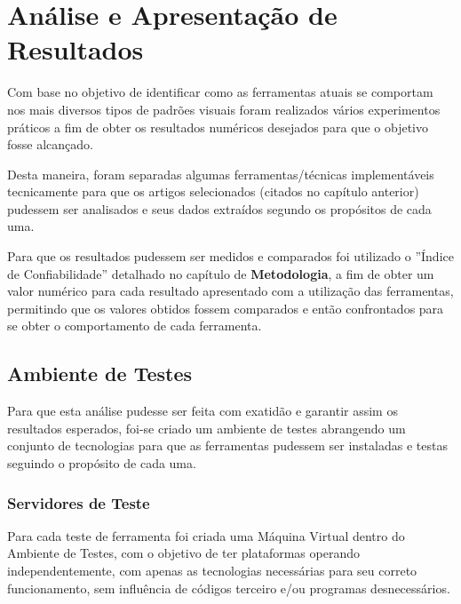 
\chapter{Análise e Apresentação de Resultados}


Com base no objetivo de identificar como as ferramentas atuais se comportam nos mais diversos tipos de padrões visuais foram realizados vários experimentos práticos a fim de obter os resultados numéricos desejados para que o objetivo fosse alcançado.

Desta maneira, foram separadas algumas ferramentas/técnicas implementáveis tecnicamente para que os artigos selecionados (citados no capítulo anterior) pudessem ser analisados e seus dados extraídos segundo os propósitos de cada uma.


Para que os resultados pudessem ser medidos e comparados foi utilizado o ''Índice de Confiabilidade'' detalhado no capítulo de \textbf{Metodologia}, a fim de obter um valor numérico para cada resultado apresentado com a utilização das ferramentas, permitindo que os valores obtidos fossem comparados e então confrontados para se obter o comportamento de cada ferramenta.



\section{Ambiente de Testes}

Para que esta análise pudesse ser feita com exatidão e garantir assim os resultados esperados, foi-se criado um ambiente de testes abrangendo um conjunto de tecnologias para que as ferramentas pudessem ser instaladas e testas seguindo o propósito de cada uma.

\subsection{Servidores de Teste}

Para cada teste de ferramenta foi criada uma Máquina Virtual dentro do Ambiente de Testes, com o objetivo de ter plataformas operando independentemente, com apenas as tecnologias necessárias para seu correto funcionamento, sem influência de códigos terceiro e/ou programas desnecessários.

